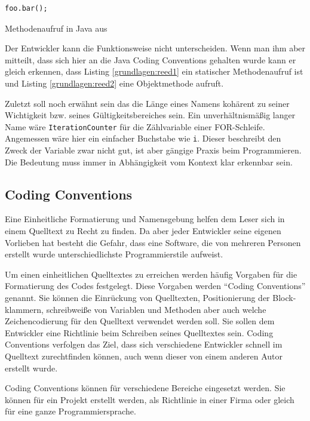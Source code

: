 \begin{listing}
    \begin{verbatim}
foo.bar();
    \end{verbatim}
    \caption{Methodenaufruf in Java aus \cite[S. 182]{reed}}
    \label{grundlagen:reed2}
\end{listing}

Der Entwickler kann die Funktionsweise nicht unterscheiden.
Wenn man ihm aber mitteilt, dass sich hier an die Java Coding Conventions gehalten wurde kann er gleich erkennen,
dass Listing \ref{grundlagen:reed1} ein statischer Methodenaufruf ist und
Listing \ref{grundlagen:reed2} eine Objektmethode aufruft.

Zuletzt soll noch erwähnt sein das die Länge eines Namens kohärent zu seiner Wichtigkeit bzw. seines Gültigkeitsbereiches sein.
Ein unverhältnismäßig langer Name wäre \texttt{IterationCounter} für die Zählvariable einer FOR-Schleife. Angemessen wäre hier ein einfacher Buchstabe wie \texttt{i}. Dieser beschreibt den Zweck der Variable zwar nicht gut, ist aber gängige Praxis beim Programmieren. Die Bedeutung muss immer in Abhängigkeit vom Kontext klar erkennbar sein.



\subsection{Coding Conventions}

Eine Einheitliche Formatierung und Namensgebung helfen dem Leser sich in einem Quelltext zu Recht zu finden. Da aber jeder Entwickler seine eigenen Vorlieben hat besteht die Gefahr, dass eine Software, die von mehreren Personen erstellt wurde unterschiedlichste Programmierstile aufweist. 

Um einen einheitlichen Quelltextes zu erreichen werden häufig Vorgaben für die Formatierung des Codes festgelegt. Diese Vorgaben werden \enquote{Coding Conventions} genannt. Sie können die Einrückung von Quelltexten,
Positionierung der Block-klammern, schreibweiße von Variablen und Methoden aber auch
welche Zeichencodierung für den Quelltext verwendet werden soll. Sie sollen dem Entwickler eine Richtlinie beim Schreiben seines Quelltextes sein. Coding Conventions verfolgen das Ziel, dass sich verschiedene Entwickler schnell im Quelltext zurechtfinden können, auch wenn dieser von einem anderen Autor erstellt wurde.

Coding Conventions können für verschiedene Bereiche eingesetzt werden. Sie können für
ein Projekt erstellt werden, als Richtlinie in einer Firma oder gleich für eine ganze Programmiersprache.

